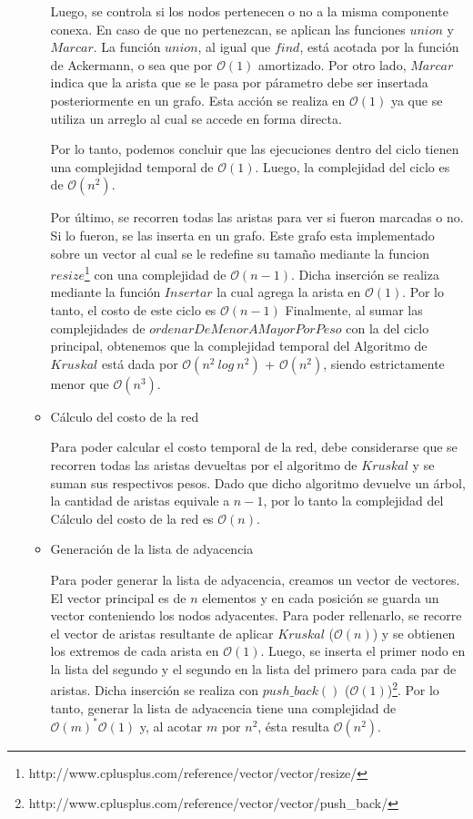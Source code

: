 \begin{itemize}
\begin{itemize}
 Luego, se controla si los nodos pertenecen o no a la misma componente conexa. En caso de que no pertenezcan, se aplican las funciones $union$ y $Marcar$. La función $union$, al igual que $find$, está acotada por la función de Ackermann, o sea que por $\mathcal{O}(1)$ amortizado. Por otro lado, $Marcar$ indica que la arista que se le pasa por párametro debe ser insertada posteriormente en un grafo. Esta acción se realiza en $\mathcal{O}(1)$ ya que se utiliza un arreglo al cual se accede en forma directa.\newline
 
 Por lo tanto, podemos concluir que las ejecuciones dentro del ciclo tienen una complejidad temporal de $\mathcal{O}(1)$. Luego, la complejidad del ciclo es de $\mathcal{O}(n^{2})$. \newline

 Por último, se recorren todas las aristas para ver si fueron marcadas o no. Si lo fueron, se las inserta en un grafo. Este grafo esta implementado sobre un vector al cual se le redefine su tamaño mediante la funcion $resize$\footnote{http://www.cplusplus.com/reference/vector/vector/resize/} con una complejidad de $\mathcal{O}(n-1)$. Dicha inserción se realiza mediante la función $Insertar$ la cual agrega la arista en $\mathcal{O}(1)$. Por lo tanto, el costo de este ciclo es $\mathcal{O}(n-1)$
\newline
\newline
 Finalmente, al sumar las complejidades de $ordenarDeMenorAMayorPorPeso$ con la del ciclo principal, obtenemos que la complejidad temporal del Algoritmo de $Kruskal$ está dada por $\mathcal{O}(n^{2}\ log\ n^{2})$ + $\mathcal{O}(n^{2})$, siendo estrictamente menor que $\mathcal{O}(n^{3})$.
 
 \item Cálculo del costo de la red

  Para poder calcular el costo temporal de la red, debe considerarse que se recorren todas las aristas devueltas por el algoritmo de $Kruskal$ y se suman sus respectivos pesos. Dado que dicho algoritmo devuelve un árbol, la cantidad de aristas equivale a $n - 1$, por lo tanto la complejidad del Cálculo del costo de la red es $\mathcal{O}(n)$.\newline
  
	\item Generación de la lista de adyacencia
 
  Para poder generar la lista de adyacencia, creamos un vector de vectores. El vector principal es de $n$ elementos y en cada posición se guarda un vector conteniendo los nodos adyacentes. Para poder rellenarlo, se recorre el vector de aristas resultante de aplicar $Kruskal$ ($\mathcal{O}(n)$) y se obtienen los extremos de cada arista en $\mathcal{O}(1)$. Luego, se inserta el primer nodo en la lista del segundo y el segundo en la lista del primero para cada par de aristas. Dicha inserción se realiza con $push\_back()$ ($\mathcal{O}(1)$)\footnote{http://www.cplusplus.com/reference/vector/vector/push_back/}. Por lo tanto, generar la lista de adyacencia tiene una complejidad de $\mathcal{O}(m)^*\mathcal{O}(1)$ y, al acotar $m$ por $n^{2}$, ésta resulta $\mathcal{O}(n^{2})$.
	

\end{itemize}
\end{itemize}

